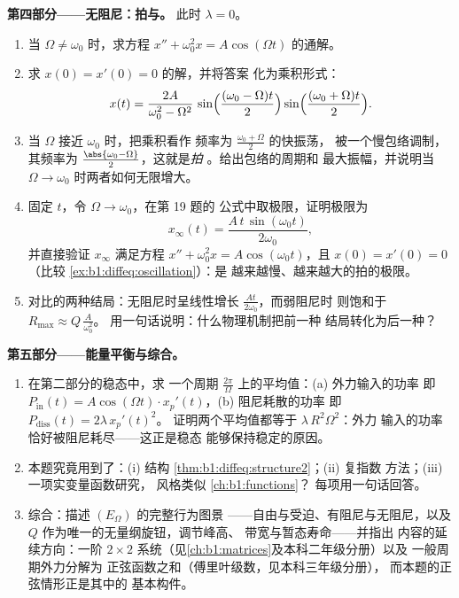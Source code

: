 \begin{problem}
\medskip
\noindent\textbf{第四部分——无阻尼：拍与。}
此时 $\lambda = 0$。
\begin{enumerate}[resume]
  \item 当 $\Omega \neq \omega_0$ 时，求方程
        $x'' + \omega_0^2 x = A\cos(\Omega t)$ 的通解。
  \item 求 $x(0) = x'(0) = 0$ 的解，并将答案
        化为乘积形式：
        \[
        x(t) = \frac{2A}{\omega_0^2 - \Omega^2}\,
        \sin\Bigl(\frac{(\omega_0 - \Omega)t}2\Bigr)
        \sin\Bigl(\frac{(\omega_0 + \Omega)t}2\Bigr) .
        \]
  \item 当 $\Omega$ 接近 $\omega_0$ 时，把乘积看作
        频率为 $\frac{\omega_0 + \Omega}2$ 的快振荡，
        被一个慢包络调制，其频率为
        $\frac{\abs{\omega_0 - \Omega}}2$，这就是\emph{拍}
        。给出包络的周期和
        最大振幅，并说明当 $\Omega
        \to \omega_0$ 时两者如何无限增大。
  \item 固定 $t$，令 $\Omega \to \omega_0$，在第 19 题的
        公式中取极限，证明极限为
        \[
        x_\infty(t) = \frac{A\,t\,\sin(\omega_0 t)}{2\omega_0} ,
        \]
        并直接验证 $x_\infty$ 满足方程
        $x'' + \omega_0^2 x = A\cos(\omega_0 t)$，且
        $x(0) = x'(0) = 0$（比较
        \cref{ex:b1:diffeq:oscillation}）：是
        越来越慢、越来越大的拍的极限。
  \item 对比的两种结局：无阻尼时呈线性增长
        $\frac{At}{2\omega_0}$，而弱阻尼时
        则饱和于 $R_{\max} \approx Q\,\frac{A}{\omega_0^2}$。
        用一句话说明：什么物理机制把前一种
        结局转化为后一种？
\end{enumerate}

\medskip
\noindent\textbf{第五部分——能量平衡与综合。}
\begin{enumerate}[resume]
  \item 在第二部分的稳态中，求
        一个周期 $\frac{2\pi}\Omega$ 上的平均值：(a) 外力输入的功率
        即 $P_{\mathrm{in}}(t) = A\cos(\Omega t)
        \cdot x_p'(t)$，(b) 阻尼耗散的功率
        即 $P_{\mathrm{diss}}(t) = 2\lambda\,x_p'(t)^2$。
        证明两个平均值都等于 $\lambda\,R^2\Omega^2$：外力
        输入的功率恰好被阻尼耗尽——这正是稳态
        能够保持稳定的原因。
  \item 本题究竟用到了：(i) 结构
        \cref{thm:b1:diffeq:structure2}；(ii) 复指数
        方法；(iii) 一项实变量函数研究，
        风格类似 \cref{ch:b1:functions}？
        每项用一句话回答。
  \item 综合：描述 $(E_\Omega)$ 的完整行为图景
——自由与受迫、有阻尼与无阻尼，以及
        $Q$ 作为唯一的无量纲旋钮，调节峰高、
        带宽与暂态寿命——并指出
        内容的延续方向：一阶 $2 \times 2$
        系统（见\cref{ch:b1:matrices}及本科二年级分册）以及
        一般周期外力分解为
        正弦函数之和（傅里叶级数，见本科三年级分册），
        而本题的正弦情形正是其中的
        基本构件。
\end{enumerate}
\end{problem}
